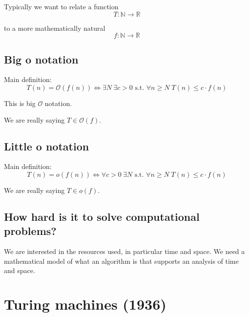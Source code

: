 \documentclass[a4paper,12pt]{article}
\theoremstyle{definition}
\theoremstyle{remark}
\newcommand{\N}{\mathbb{N}}
\newcommand{\R}{\mathbb{R}}
\begin{document}
Typically we want to relate a function
\begin{equation*}
    T: \N \to \R
\end{equation*}

to a more mathematically natural
\begin{equation*}
    f: \N \to \R
\end{equation*}

\subsection{Big o notation}
Main definition:
\begin{equation*}
    T(n) = \mathscr{O}(f(n)) \iff \exists N \: \exists c > 0 \text{ s.t. } \forall n \geq N \; T(n) \leq c \cdot f(n)
\end{equation*}

This is big $\mathscr{O}$ notation.

We are really saying $T \in \mathscr{O}(f)$.


\subsection{Little o notation}
Main definition:
\begin{equation*}
    T(n) = o(f(n)) \iff \forall c > 0 \: \exists N \text{ s.t. } \forall n \geq N \; T(n) \leq c \cdot f(n)
\end{equation*}

We are really saying $T \in o(f)$.






\newpage


\subsection*{How hard is it to solve computational problems?}

We are interested in the resources used, in particular time and space. We need a mathematical model of what an algorithm is that supports an analysis
of time and space.

\section{Turing machines (1936)}
\end{document}
